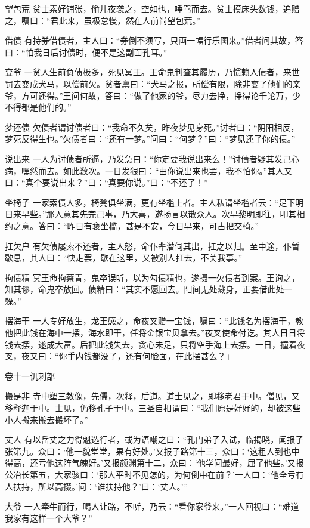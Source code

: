 \documentclass[12pt,UTF8]{ctexbook}
\begin{document}
望包荒
贫士素好铺张，偷儿夜袭之，空如也，唾骂而去。贫士摸床头数钱，追赠之，嘱曰：“君此来，虽极怠慢，然在人前尚望包荒。”

借债
有持券借债者，主人曰：“券倒不须写，只画一幅行乐图来。”借者问其故，答曰：“怕我日后讨债时，便不是这副面孔耳。”

变爷
一贫人生前负债极多，死见冥王。王命鬼判查其履历，乃惯赖人债者，来世罚去变成犬马，以偿前欠。贫者禀曰：“犬马之报，所偿有限，除非变了他们的亲爷，方可还得。”王问何故，答曰：“做了他家的爷，尽力去挣，挣得论千论万，少不得都是他们的。”

梦还债
欠债者谓讨债者曰：“我命不久矣，昨夜梦见身死。”讨者曰：“阴阳相反，梦死反得生也。”欠债者曰：“还有一梦。”问曰：“何梦？”曰：“梦见还了你的债。”

说出来
一人为讨债者所逼，乃发急曰：“你定要我说出来么！”讨债者疑其发己心病，嘿然而去。如此数次。一日发狠曰：“由你说出来也罢，我不怕你。”其人又曰：“真个要说出来？”曰：“真要你说。”曰：“不还了！”

坐椅子
一家索债人多，椅凳俱坐满，更有坐槛上者。主人私谓坐槛者云：“足下明日来早些。”那人意其先完己事，乃大喜，遂扬言以散众人。次早黎明即往，叩其相约之意。答曰：“昨日有亵坐槛，甚是不安，今日早来，可占把交椅。”

扛欠户
有欠债屡索不还者，主人怒，命仆辈潜伺其出，扛之以归。至中途，仆暂歇息，其人曰：“快走罢，歇在这里，又被别人扛去，不关我事。”

拘债精
冥王命拘蔡青，鬼卒误听，以为勾债精也，遂摄一欠债者到案。王询之，知其谬，命鬼卒放回。债精曰：“其实不愿回去。阳间无处藏身，正要借此处一躲。”

摆海干
一人专好放生，龙王感之，命夜叉赠一宝钱，嘱曰：“此钱名为摆海干，教他把此钱在海中一摆，海水即干，任将金银宝贝拿去。”夜叉使命付讫。其人日日将钱去摆，遂成大富。后把此钱失去，贪心未足，只将空手海上去摆。一日，撞着夜叉，夜又曰：“你手内钱都没了，还有何脸面，在此摆甚么？」

卷十一讥刺部

搬是非
寺中塑三教像，先儒，次释，后道。道士见之，即移老君于中。僧见，又移释迦于中。士见，仍移孔子于中。三圣自相谓曰：“我们原是好好的，却被这些小人搬来搬去搬坏了。”

丈人
有以岳丈之力得魁选行者，或为语嘲之曰：“孔门弟子入试，临揭晓，闻报子张第九。众曰：‘他一貌堂堂，果有好处。’又报子路第十三，众曰：‘这粗人到也中得高，还亏他这阵气魄好。’又报颜渊第十二，众曰：‘他学问最好，屈了他些。’又报公冶长第五，大家骇曰：‘那人平时不见怎的，为何倒中在前？’一人曰：‘他全亏有人扶持，所以高掇。’问：‘谁扶持他？’曰：‘丈人。’”

大爷
一人牵牛而行，喝人让路，不听，乃云：“看你家爷来。”一人回视曰：“难道我家有这样一个大爷？”
\end{document}
